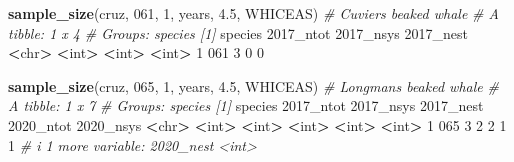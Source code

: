 \documentclass[
]{book}
\newenvironment{Shaded}{\begin{snugshade}}{\end{snugshade}}
\newcommand{\AttributeTok}[1]{\textcolor[rgb]{0.13,0.29,0.53}{#1}}
\newcommand{\CommentTok}[1]{\textcolor[rgb]{0.56,0.35,0.01}{\textit{#1}}}
\newcommand{\DecValTok}[1]{\textcolor[rgb]{0.00,0.00,0.81}{#1}}
\newcommand{\ErrorTok}[1]{\textcolor[rgb]{0.64,0.00,0.00}{\textbf{#1}}}
\newcommand{\FloatTok}[1]{\textcolor[rgb]{0.00,0.00,0.81}{#1}}
\newcommand{\FunctionTok}[1]{\textcolor[rgb]{0.13,0.29,0.53}{\textbf{#1}}}
\newcommand{\NormalTok}[1]{#1}
\newcommand{\SpecialCharTok}[1]{\textcolor[rgb]{0.81,0.36,0.00}{\textbf{#1}}}
\newcommand{\StringTok}[1]{\textcolor[rgb]{0.31,0.60,0.02}{#1}}
\begin{document}
\begin{Shaded}
\begin{Highlighting}[]
\FunctionTok{sample\_size}\NormalTok{(cruz, }\StringTok{\textquotesingle{}061\textquotesingle{}}\NormalTok{, }\DecValTok{1}\NormalTok{, years, }\FloatTok{4.5}\NormalTok{, }\StringTok{\textquotesingle{}WHICEAS\textquotesingle{}}\NormalTok{) }\CommentTok{\# Cuvier\textquotesingle{}s beaked whale}
\CommentTok{\# A tibble: 1 x 4}
\CommentTok{\# Groups:   species [1]}
\NormalTok{  species }\StringTok{\textasciigrave{}}\AttributeTok{2017\_ntot}\StringTok{\textasciigrave{}} \StringTok{\textasciigrave{}}\AttributeTok{2017\_nsys}\StringTok{\textasciigrave{}} \StringTok{\textasciigrave{}}\AttributeTok{2017\_nest}\StringTok{\textasciigrave{}}
  \SpecialCharTok{\textless{}}\NormalTok{chr}\SpecialCharTok{\textgreater{}}         \ErrorTok{\textless{}}\NormalTok{int}\SpecialCharTok{\textgreater{}}       \ErrorTok{\textless{}}\NormalTok{int}\SpecialCharTok{\textgreater{}}       \ErrorTok{\textless{}}\NormalTok{int}\SpecialCharTok{\textgreater{}}
\DecValTok{1} \DecValTok{061}               \DecValTok{3}           \DecValTok{0}           \DecValTok{0}

\FunctionTok{sample\_size}\NormalTok{(cruz, }\StringTok{\textquotesingle{}065\textquotesingle{}}\NormalTok{, }\DecValTok{1}\NormalTok{, years, }\FloatTok{4.5}\NormalTok{, }\StringTok{\textquotesingle{}WHICEAS\textquotesingle{}}\NormalTok{) }\CommentTok{\# Longman\textquotesingle{}s beaked whale}
\CommentTok{\# A tibble: 1 x 7}
\CommentTok{\# Groups:   species [1]}
\NormalTok{  species }\StringTok{\textasciigrave{}}\AttributeTok{2017\_ntot}\StringTok{\textasciigrave{}} \StringTok{\textasciigrave{}}\AttributeTok{2017\_nsys}\StringTok{\textasciigrave{}} \StringTok{\textasciigrave{}}\AttributeTok{2017\_nest}\StringTok{\textasciigrave{}} \StringTok{\textasciigrave{}}\AttributeTok{2020\_ntot}\StringTok{\textasciigrave{}} \StringTok{\textasciigrave{}}\AttributeTok{2020\_nsys}\StringTok{\textasciigrave{}}
  \SpecialCharTok{\textless{}}\NormalTok{chr}\SpecialCharTok{\textgreater{}}         \ErrorTok{\textless{}}\NormalTok{int}\SpecialCharTok{\textgreater{}}       \ErrorTok{\textless{}}\NormalTok{int}\SpecialCharTok{\textgreater{}}       \ErrorTok{\textless{}}\NormalTok{int}\SpecialCharTok{\textgreater{}}       \ErrorTok{\textless{}}\NormalTok{int}\SpecialCharTok{\textgreater{}}       \ErrorTok{\textless{}}\NormalTok{int}\SpecialCharTok{\textgreater{}}
\DecValTok{1} \DecValTok{065}               \DecValTok{3}           \DecValTok{2}           \DecValTok{2}           \DecValTok{1}           \DecValTok{1}
\CommentTok{\# i 1 more variable: \textasciigrave{}2020\_nest\textasciigrave{} \textless{}int\textgreater{}}


\end{Highlighting}
\end{Shaded}
\end{document}
